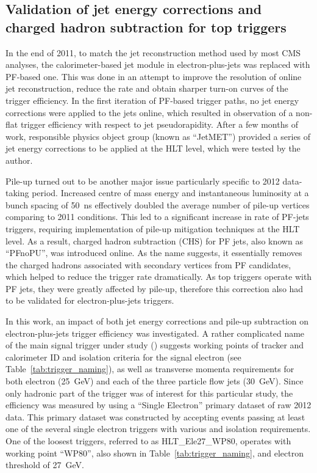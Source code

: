 \subsection{Validation of jet energy corrections and charged hadron subtraction for top triggers}
\label{ss:JEC_PFnoPU_validation}
In the end of 2011, to match the jet reconstruction method used by most CMS analyses, the calorimeter-based jet module
in electron-plus-jets was replaced with PF-based one. This was done in an attempt to improve the \pt resolution of
online jet reconstruction, reduce the rate and obtain sharper turn-on curves of the trigger efficiency. In the first
iteration of PF-based trigger paths, no jet energy corrections were applied to the jets online, which resulted in
observation of a non-flat trigger efficiency with respect to jet pseudorapidity. After a few months of work, responsible
physics object group (known as ``JetMET'') provided a series of jet energy corrections to be applied at the HLT level,
which were tested by the author.

Pile-up turned out to be another major issue particularly specific to 2012 data-taking period. Increased centre of mass
energy and instantaneous luminosity at a bunch spacing of \SI{50}{\ns} effectively doubled the average number of pile-up
vertices comparing to 2011 conditions. This led to a significant increase in rate of PF-jets triggers, requiring
implementation of pile-up mitigation techniques at the HLT level. As a result, charged hadron subtraction (CHS) for PF
jets, also known as ``PFnoPU'', was introduced online. As the name suggests, it essentially removes the charged hadrons
associated with secondary vertices from PF candidates, which helped to reduce the trigger rate dramatically. As top
triggers operate with PF jets, they were greatly affected by pile-up, therefore this correction also had to be validated
for electron-plus-jets triggers.


In this work, an impact of both jet energy corrections and pile-up subtraction on electron-plus-jets trigger efficiency
was investigated. A rather complicated name of the main signal trigger under study (\HLTThreeCentralPFJet) suggests
working points of tracker and calorimeter ID and isolation criteria for the signal electron (see
Table~\ref{tab:trigger_naming}), as well as transverse momenta requirements for both electron (\SI{25}{\GeV}) and each
of the three particle flow jets (\SI{30}{\GeV}). Since only hadronic part of the trigger was of interest for this
particular study, the efficiency was measured by using a ``Single Electron'' primary dataset of raw 2012 data. This
primary dataset was constructed by accepting events passing at least one of the several single electron triggers with
various \pt and isolation requirements. One of the loosest triggers, referred to as HLT\_Ele27\_WP80, operates with
working point ``WP80'', also shown in Table~\ref{tab:trigger_naming}, and electron \pt threshold of \SI{27}{\GeV}.

